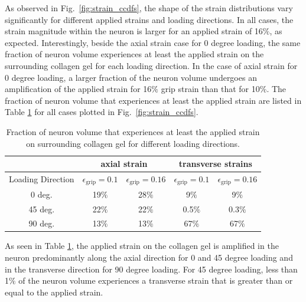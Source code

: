 \documentclass[]{interact}
\begin{document}
As observed in Fig.\ \ref{fig:strain_ccdfs}, the shape of the strain distributions vary significantly for different applied strains and loading directions. In all cases, the strain magnitude within the neuron is larger for an applied strain of 16$\%$, as expected. Interestingly, beside the axial strain case for 0 degree loading, the same fraction of neuron volume experiences at least the applied strain on the surrounding collagen gel for each loading direction. In the case of axial strain for 0 degree loading, a larger fraction of the neuron volume undergoes an amplification of the applied strain for 16$\%$ grip strain than that for 10$\%$. The fraction of neuron volume that experiences at least the applied strain are listed in Table \ref{table:ccdf_volfrac_compare} for all cases plotted in Fig.\ \ref{fig:strain_ccdfs}.
%
\begin{table}[ht]
\begin{center}
\begin{tabular}{ c c c c c }
\hline\hline
& \multicolumn{2}{c}{axial strain} & \multicolumn{2}{c}{transverse strains} \\ \hline 
Loading Direction & $\epsilon_{\text{grip}}=0.1$ & $\epsilon_{\text{grip}}=0.16$ & $\epsilon_{\text{grip}}=0.1$ & $\epsilon_{\text{grip}}=0.16$ \\
\hline 
0 deg. & 19$\%$ & 28$\%$ & 9$\%$ & 9$\%$\\ 
45 deg. & 22$\%$ & 22$\%$ & 0.5$\%$ & 0.3$\%$\\
90 deg. & 13$\%$ & 13$\%$ & 67$\%$ & 67$\%$\\ \hline \hline
\end{tabular}
\end{center}
\caption{Fraction of neuron volume that experiences at least the applied strain on surrounding collagen gel for different loading directions.}
\label{table:ccdf_volfrac_compare}
\end{table}
%

As seen in Table \ref{table:ccdf_volfrac_compare}, the applied strain on the collagen gel is amplified in the neuron predominantly along the axial direction for 0 and 45 degree loading and in the transverse direction for 90 degree loading. For 45 degree loading, less than 1$\%$ of the neuron volume experiences a transverse strain that is greater than or equal to the applied strain.
\end{document}
